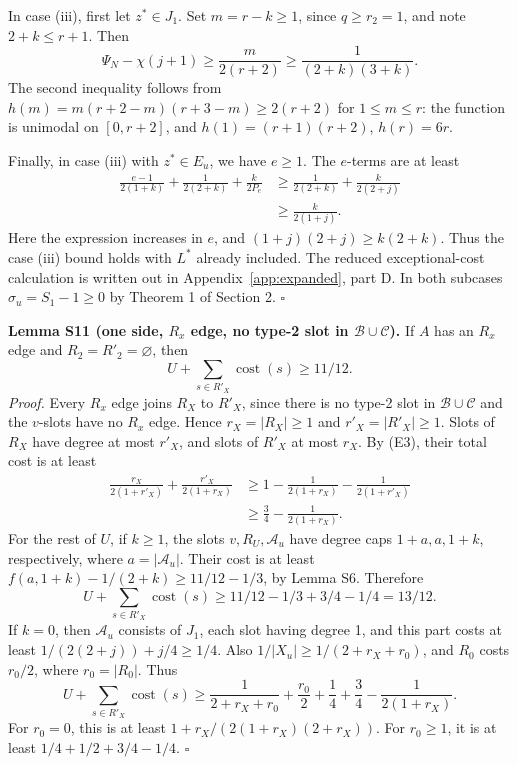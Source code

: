 In case (iii), first let $z^*\in J_1$. Set $m=r-k\ge1$, since $q\ge r_2=1$, and note $2+k\le r+1$. Then
\[
 \Psi_N-\chi(j+1)\ge\frac m{2(r+2)}\ge\frac1{(2+k)(3+k)}.
\]
The second inequality follows from $h(m)=m(r+2-m)(r+3-m)\ge2(r+2)$ for $1\le m\le r$: the function is unimodal on $[0,r+2]$, and $h(1)=(r+1)(r+2)$, $h(r)=6r$.

Finally, in case (iii) with $z^*\in E_u$, we have $e\ge1$. The $e$-terms are at least
\[
\begin{aligned}
 \frac{e-1}{2(1+k)}+\frac1{2(2+k)}+\frac k{2P_e}
 &\ge\frac1{2(2+k)}+\frac k{2(2+j)}\\
 &\ge\frac k{2(1+j)}.
\end{aligned}
\]
Here the expression increases in $e$, and $(1+j)(2+j)\ge k(2+k)$. Thus the case (iii) bound holds with $L^*$ already included.
The reduced exceptional-cost calculation is written out in Appendix~\ref{app:expanded}, part D.
In both subcases $\sigma_u=S_1-1\ge0$ by Theorem 1 of Section 2. \hfill$\square$

\textbf{Lemma S11 (one side, $R_x$ edge, no type-2 slot in $\mathcal B\cup\mathcal C$).} If $A$ has an $R_x$ edge and $R_2=R'_2=\varnothing$, then
\[
 U+\sum_{s\in R'_X}\operatorname{cost}(s)\ge11/12.
\]
\emph{Proof.} Every $R_x$ edge joins $R_X$ to $R'_X$, since there is no type-2 slot in $\mathcal B\cup\mathcal C$ and the $v$-slots have no $R_x$ edge. Hence $r_X=|R_X|\ge1$ and $r'_X=|R'_X|\ge1$. Slots of $R_X$ have degree at most $r'_X$, and slots of $R'_X$ at most $r_X$. By (E3), their total cost is at least
\[
\begin{aligned}
 \frac{r_X}{2(1+r'_X)}+\frac{r'_X}{2(1+r_X)}
 &\ge1-\frac1{2(1+r_X)}-\frac1{2(1+r'_X)}\\
 &\ge\frac34-\frac1{2(1+r_X)}.
\end{aligned}
\]
For the rest of $U$, if $k\ge1$, the slots $v,R_U,\mathcal A_u$ have degree caps $1+a,a,1+k$, respectively, where $a=|\mathcal A_u|$. Their cost is at least $f(a,1+k)-1/(2+k)\ge11/12-1/3$, by Lemma S6. Therefore
\[
 U+\sum_{s\in R'_X}\operatorname{cost}(s)\ge11/12-1/3+3/4-1/4=13/12.
\]
If $k=0$, then $\mathcal A_u$ consists of $J_1$, each slot having degree 1, and this part costs at least $1/(2(2+j))+j/4\ge1/4$. Also $1/|X_u|\ge1/(2+r_X+r_0)$, and $R_0$ costs $r_0/2$, where $r_0=|R_0|$. Thus
\[
 U+\sum_{s\in R'_X}\operatorname{cost}(s)
 \ge\frac1{2+r_X+r_0}+\frac{r_0}2+\frac14+\frac34-\frac1{2(1+r_X)}.
\]
For $r_0=0$, this is at least $1+r_X/(2(1+r_X)(2+r_X))$. For $r_0\ge1$, it is at least $1/4+1/2+3/4-1/4$. \hfill$\square$

